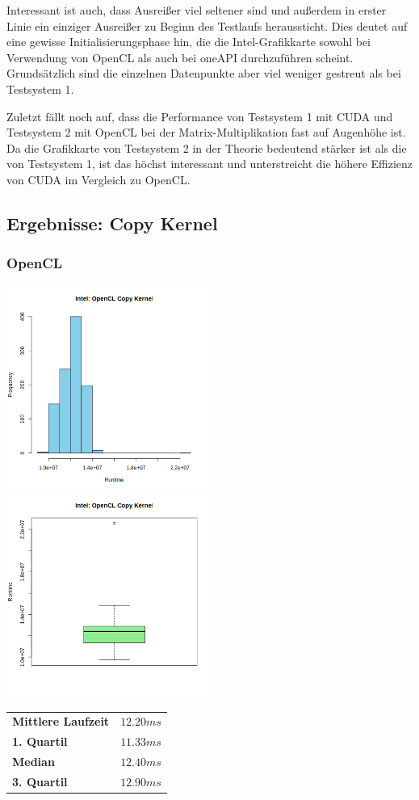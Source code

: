 \documentclass[12pt]{article}
\begin{document}
	Interessant ist auch, dass Ausreißer viel seltener sind und außerdem in erster Linie ein einziger Ausreißer zu Beginn des Testlaufs heraussticht.
	Dies deutet auf eine gewisse Initialisierungsphase hin, die die Intel-Grafikkarte sowohl bei Verwendung von OpenCL als auch bei oneAPI durchzuführen scheint.
	Grundsätzlich sind die einzelnen Datenpunkte aber viel weniger gestreut als bei Testsystem 1.
	
	Zuletzt fällt noch auf, dass die Performance von Testsystem 1 mit CUDA und Testsystem 2 mit OpenCL bei der Matrix-Multiplikation fast auf Augenhöhe ist.
	Da die Grafikkarte von Testsystem 2 in der Theorie bedeutend stärker ist als die von Testsystem 1, ist das höchst interessant und unterstreicht die höhere Effizienz von CUDA im Vergleich zu OpenCL.

	\subsection*{Ergebnisse: Copy Kernel}	
	\subsubsection*{OpenCL}
	\includegraphics[width=0.5\textwidth]{../statistics/intel/opencl/histogram_copy.png}
	\includegraphics[width=0.5\textwidth]{../statistics/intel/opencl/boxplot_copy.png}
	\\
	\begin{center}
		\begin{tabular}{|l|l|}
			\toprule
			\textbf{Mittlere Laufzeit} 		& $12.20ms$ \\
			\textbf{1. Quartil}				& $11.33ms$ \\
			\textbf{Median}					& $12.40ms$  \\
			\textbf{3. Quartil}				& $12.90ms$  \\
			\bottomrule
		\end{tabular}
	\end{center}
	
\end{document}
